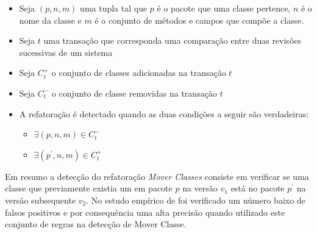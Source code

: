 \documentclass[12pt]{article}
\begin{document}
\begin{itemize}
	\item Seja $(p,n,m)$ uma tupla tal que $p$ é o pacote que uma classe pertence, $n$ é o nome da classe e $m$ é o conjunto de métodos e campos que compõe a classe.
	\item Seja $t$ uma transação que corresponda uma comparação entre duas revisões sucessivas de um sistema
	\item Seja $C^{+}_{t}$ o conjunto de classes adicionadas na transação $t$
	\item Seja $C^{-}_{t}$ o conjunto de classe removidas na transação $t$
	\item A refatoração é detectado quando as duas condições a seguir são verdadeiras:
		\begin{itemize}
			
			\item $\exists (p,n,m) \in C^{-}_{t}$
			\item $\exists (p^{'},n,m) \in C^{+}_{t}$
		
		\end{itemize}
\end{itemize}

Em resumo a detecção do refatoração \textit{Mover Classes} consiste em verificar se uma classe que previamente existia um em pacote $p$ na versão $v_{1}$ está no pacote $p^{'}$ na versão subsequente $v_{2}$. No estudo empírico de \cite{Tsantalis2013} foi verificado um número baixo de falsos positivos e por consequência uma alta precisão quando utilizado este conjunto de regras na detecção de Mover Classe.

%



%
\end{document}
